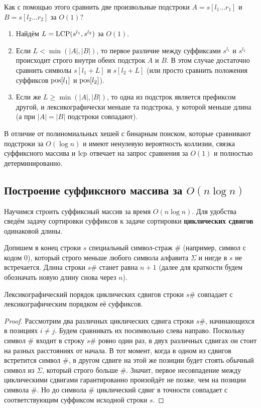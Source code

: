 Как с помощью этого сравнить две произвольные подстроки $A = s[l_1 \dots r_1]$ и $B = s[l_2 \dots r_2]$ за $O(1)$?
\begin{enumerate}
    \item Найдём $L = \operatorname{LCP}(s^{l_1}, s^{l_2})$ за $O(1)$.
    \item Если $L < \min(|A|, |B|)$, то первое различие между суффиксами $s^{l_1}$ и $s^{l_2}$ происходит строго внутри обеих подстрок $A$ и $B$. В этом случае достаточно сравнить символы $s[l_1 + L]$ и $s[l_2 + L]$ (или просто сравнить положения суффиксов $\operatorname{pos}[l_1]$ и $\operatorname{pos}[l_2]$).
    \item Если же $L \ge \min(|A|, |B|)$, то одна из подстрок является префиксом другой, и лексикографически меньше та подстрока, у которой меньше длина (а при $|A| = |B|$ подстроки совпадают).
\end{enumerate}
В отличие от полиномиальных хешей с бинарным поиском, которые сравнивают подстроки за $O(\log n)$ и имеют ненулевую вероятность коллизии, связка суффиксного массива и $\operatorname{lcp}$ отвечает на запрос сравнения за $O(1)$ и полностью детерминированно.

\subsection{Построение суффиксного массива за \texorpdfstring{$O(n \log n)$}{O(n log n)}}

Научимся строить суффиксный массив за время $O(n \log n)$. Для удобства сведём задачу сортировки суффиксов к задаче сортировки \textbf{циклических сдвигов} одинаковой длины.

Допишем в конец строки $s$ специальный символ-страж $\mathtt{\#}$ (например, символ с кодом $0$), который строго меньше любого символа алфавита $\Sigma$ и нигде в $s$ не встречается. Длина строки $s\mathtt{\#}$ станет равна $n + 1$ (далее для краткости будем обозначать новую длину снова через $n$).

\begin{proposition}
    Лексикографический порядок циклических сдвигов строки $s\mathtt{\#}$ совпадает с лексикографическим порядком её суффиксов.
\end{proposition}

\begin{proof}
    Рассмотрим два различных циклических сдвига строки $s\mathtt{\#}$, начинающихся в позициях $i \ne j$. Будем сравнивать их посимвольно слева направо. Поскольку символ $\mathtt{\#}$ входит в строку $s\mathtt{\#}$ ровно один раз, в двух различных сдвигах он стоит на разных расстояниях от начала. В тот момент, когда в одном из сдвигов встретится символ $\mathtt{\#}$, в другом сдвиге на этой же позиции будет стоять обычный символ из $\Sigma$, который строго больше $\mathtt{\#}$. Значит, первое несовпадение между циклическими сдвигами гарантированно произойдёт не позже, чем на позиции символа $\mathtt{\#}$. Но до символа $\mathtt{\#}$ циклический сдвиг в точности совпадает с соответствующим суффиксом исходной строки $s$.
\end{proof}

